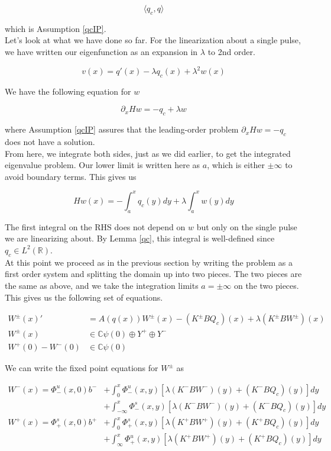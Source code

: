 \documentclass[12pt]{article}
\def\R{{\mathbb R}}
\def\C{{\mathbb C}}
\begin{document}
\[
\langle q_c, q \rangle
\]

which is Assumption \ref{qcIP}.\\

Let's look at what we have done so far. For the linearization about a single pulse, we have written our eigenfunction as an expansion in $\lambda$ to 2nd order.

\begin{equation}\label{eigenfntosecondorder}
v(x) = q'(x) - \lambda q_c(x) + \lambda^2 w(x)
\end{equation}

We have the following equation for $w$

\[
\partial_x H w = -q_c + \lambda w 
\]

where Assumption \ref{qcIP} assures that the leading-order problem $\partial_x H w = -q_c$ does not have a solution.\\

From here, we integrate both sides, just as we did earlier, to get the integrated eigenvalue problem. Our lower limit is written here as $a$, which is either $\pm \infty$ to avoid boundary terms. This gives us

\[
H w(x) = -\int_a^x q_c(y) dy + \lambda \int_a^x w(y) dy 
\]

The first integral on the RHS does not depend on $w$ but only on the single pulse we are linearizing about. By Lemma \ref{qc}, this integral is well-defined since $q_c \in L^2(\R)$. \\

At this point we proceed as in the previous section by writing the problem as a first order system and splitting the domain up into two pieces. The two pieces are the same as above, and we take the integration limits $a = \pm \infty$ on the two pieces. This gives us the following set of equations.

\begin{align*}
W^\pm(x)' &= A(q(x)) W^\pm(x) - (K^\pm B Q_c)(x) + \lambda (K^\pm B W^\pm)(x) \\
W^\pm(x) &\in \C \psi(0) \oplus Y^+ \oplus Y^- \\
W^+(0) - W^-(0) &\in \C \psi(0) 
\end{align*}

We can write the fixed point equations for $W^\pm$ as

\begin{align*}
W^-(x) = \Phi^u_-(x, 0)b^- &+ \int_0^x \Phi^u_-(x, y)[\lambda (K^- B W^-)(y) + (K^- B Q_c)(y) ] dy \\
&+ \int_{-\infty}^x \Phi^s_-(x, y)[\lambda (K^- B W^-)(y) + (K^- B Q_c)(y) ] dy \\
W^+(x) = \Phi^s_+(x, 0)b^+ &+ \int_0^x \Phi^s_+(x, y)[\lambda (K^+ B W^+)(y) + (K^+ B Q_c)(y) ] dy \\
&+ \int_{\infty}^x \Phi^u_+(x, y)[\lambda (K^+ B W^+)(y) + (K^+ B Q_c)(y) ] dy
\end{align*}
\end{document}
